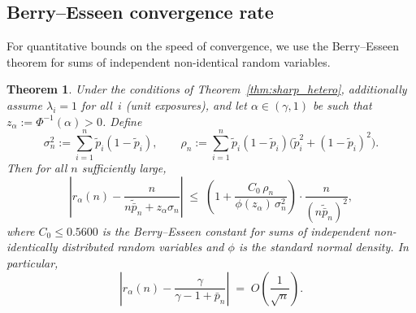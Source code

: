 \documentclass[11pt]{article}
\newtheorem{theorem}{Theorem}[section]
\theoremstyle{definition}
\newcommand{\1}{\mathbf{1}}
\begin{document}
\subsection{Berry--Esseen convergence rate}\label{sec:berry_esseen}

For quantitative bounds on the speed of convergence, we use the Berry--Esseen theorem for sums of independent non-identical random variables.

\begin{theorem}\label{thm:berry_esseen}
Under the conditions of Theorem~\ref{thm:sharp_hetero}, additionally assume $\lambda_i = 1$ for all~$i$ (unit exposures), and let $\alpha \in (\gamma, 1)$ be such that $z_\alpha := \Phi^{-1}(\alpha) > 0$. Define
\begin{equation}\label{eq:sigma_rho}
  \sigma_n^2 := \sum_{i=1}^n \tilde{p}_i(1-\tilde{p}_i),
  \qquad
  \rho_n := \sum_{i=1}^n \tilde{p}_i(1-\tilde{p}_i)\bigl(\tilde{p}_i^2 + (1-\tilde{p}_i)^2\bigr).
\end{equation}
Then for all $n$ sufficiently large,
\begin{equation}\label{eq:be_rate}
  \left|r_\alpha(n) - \frac{n}{n\tilde{\bar{p}}_n + z_\alpha \sigma_n}\right|
  \;\leq\; \left(1 + \frac{C_0\,\rho_n}{\phi(z_\alpha)\,\sigma_n^2}\right) \cdot \frac{n}{(n\tilde{\bar{p}}_n)^2},
\end{equation}
where $C_0 \leq 0.5600$ is the Berry--Esseen constant for sums of independent non-identically distributed random variables \citep{Shevtsova2011} and $\phi$ is the standard normal density. In particular,
\begin{equation}\label{eq:rate_order}
  \left|r_\alpha(n) - \frac{\gamma}{\gamma - 1 + \bar{p}_n}\right|
  \;=\; O\!\left(\frac{1}{\sqrt{n}}\right).
\end{equation}
\end{theorem}
\end{document}
